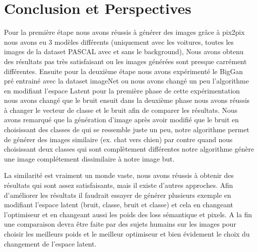 \chapter{Conclusion et Perspectives}
Pour la première étape nous avons réussis à générer des images grâce à pix2pix nous avons eu 3 modèles différents (uniquement avec les voitures, toutes les images de la dataset PASCAL avec et sans le background), Nous avons obtenu des résultats pas très satisfaisant ou les images générées sont presque carrément différentes. Ensuite pour la deuxième étape nous avons expérimenté le BigGan  pré entrainé avec la dataset imageNet ou nous avons changé un peu  l'algorithme en modifiant l'espace Latent pour la première phase de cette expérimentation nous avons changé que le bruit  ensuit dans la deuxième phase nous avons réussis à changer le vecteur de classe et le bruit afin de comparer les résultats. Nous avons remarqué que la génération d'image après avoir modifié que le bruit en choisissant des classes de qui se ressemble juste un peu, notre algorithme permet de générer des images similaire (ex. chat vers chien) par contre quand nous choisissant deux classes qui sont complètement différentes notre algorithme génère une image complétement dissimilaire à notre image but.

La similarité est vraiment un monde vaste, nous avons réussis à obtenir des résultats qui sont assez satisfaisants, mais il existe d'autres approches. Afin d'améliorer les résultats il faudrait essayer de générer plusieurs exemple en modifiant l'espace latent (bruit, classe, bruit et classe) et cela en changeant l'optimiseur et en changeant aussi les poids des loss sémantique et pixels.  A la fin une comparaison devra être faite par des sujets humains sur les images pour choisir les meilleurs poids et le meilleur optimiseur et bien évidement le choix du changement de l'espace latent.